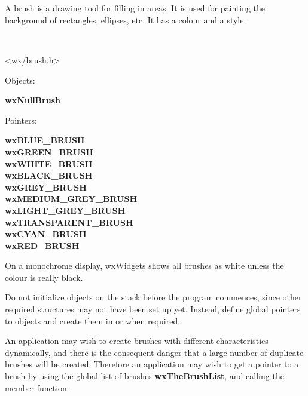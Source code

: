 
\section{}\label{wxbrush}

A brush is a drawing tool for filling in areas. It is used for painting
the background of rectangles, ellipses, etc. It has a colour and a
style.


\\


<wx/brush.h>


Objects:

{\bf wxNullBrush}

Pointers:

{\bf wxBLUE\_BRUSH\\
wxGREEN\_BRUSH\\
wxWHITE\_BRUSH\\
wxBLACK\_BRUSH\\
wxGREY\_BRUSH\\
wxMEDIUM\_GREY\_BRUSH\\
wxLIGHT\_GREY\_BRUSH\\
wxTRANSPARENT\_BRUSH\\
wxCYAN\_BRUSH\\
wxRED\_BRUSH}


On a monochrome display, wxWidgets shows
all brushes as white unless the colour is really black.

Do not initialize objects on the stack before the program commences,
since other required structures may not have been set up yet. Instead,
define global pointers to objects and create them in  or
when required.

An application may wish to create brushes with different
characteristics dynamically, and there is the consequent danger that a
large number of duplicate brushes will be created. Therefore an
application may wish to get a pointer to a brush by using the global
list of brushes {\bf wxTheBrushList}, and calling the member function
.

